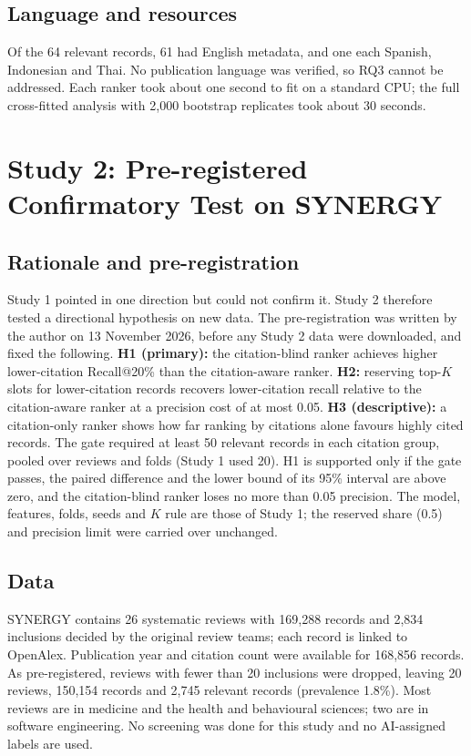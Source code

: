 \documentclass[acmsmall,screen,nonacm]{acmart}
\begin{document}
\subsection{Language and resources}

Of the 64 relevant records, 61 had English metadata, and one each Spanish, Indonesian and Thai. No publication
language was verified, so RQ3 cannot be addressed. Each ranker took about one second to fit on a standard
CPU; the full cross-fitted analysis with 2,000 bootstrap replicates took about 30 seconds.

\section{Study 2: Pre-registered Confirmatory Test on SYNERGY}
\label{sec:study2}

\subsection{Rationale and pre-registration}

Study 1 pointed in one direction but could not confirm it. Study 2 therefore tested a directional
hypothesis on new data. The pre-registration was written by the author on 13 November 2026, before any
Study 2 data were downloaded, and fixed the following. \textbf{H1 (primary):} the citation-blind ranker
achieves higher lower-citation Recall@20\% than the citation-aware ranker. \textbf{H2:} reserving top-$K$
slots for lower-citation records recovers lower-citation recall relative to the citation-aware ranker at
a precision cost of at most 0.05. \textbf{H3 (descriptive):} a citation-only ranker shows how far ranking
by citations alone favours highly cited records. The gate required at least 50 relevant records in each
citation group, pooled over reviews and folds (Study 1 used 20). H1 is supported only if the gate passes,
the paired difference and the lower bound of its 95\% interval are above zero, and the citation-blind
ranker loses no more than 0.05 precision. The model, features, folds, seeds and $K$ rule are those of
Study 1; the reserved share (0.5) and precision limit were carried over unchanged.

\subsection{Data}

SYNERGY \cite{debruin2023synergy} contains 26 systematic reviews with 169,288 records and 2,834
inclusions decided by the original review teams; each record is linked to OpenAlex. Publication year and
citation count were available for 168,856 records. As pre-registered, reviews with fewer than 20
inclusions were dropped, leaving 20 reviews, 150,154 records and 2,745 relevant records (prevalence
1.8\%). Most reviews are in medicine and the health and behavioural sciences; two are in software engineering. No screening was done for this
study and no AI-assigned labels are used.
\end{document}
